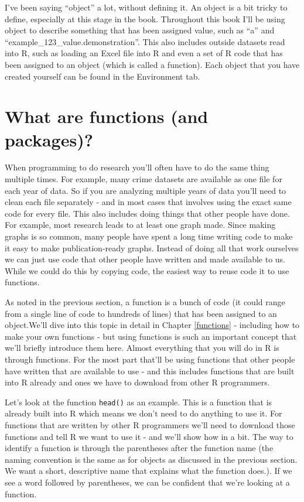 \documentclass[
]{krantz}
\begin{document}
I've been saying ``object'' a lot, without defining it. An object is a bit tricky to define, especially at this stage in the book. Throughout this book I'll be using object to describe something that has been assigned value, such as ``a'' and ``example\_123\_value.demonstration''. This also includes outside datasets read into R, such as loading an Excel file into R and even a set of R code that has been assigned to an object (which is called a function). Each object that you have created yourself can be found in the Environment tab.

\hypertarget{functions-intro}{%
\section{What are functions (and packages)?}\label{functions-intro}}

When programming to do research you'll often have to do the same thing multiple times. For example, many crime datasets are available as one file for each year of data. So if you are analyzing multiple years of data you'll need to clean each file separately - and in most cases that involves using the exact same code for every file. This also includes doing things that other people have done. For example, most research leads to at least one graph made. Since making graphs is so common, many people have spent a long time writing code to make it easy to make publication-ready graphs. Instead of doing all that work ourselves we can just use code that other people have written and made available to us. While we could do this by copying code, the easiest way to reuse code it to use functions.

As noted in the previous section, a function is a bunch of code (it could range from a single line of code to hundreds of lines) that has been assigned to an object.We'll dive into this topic in detail in Chapter \ref{functions} - including how to make your own functions - but using functions is such an important concept that we'll briefly introduce them here. Almost everything that you will do in R is through functions. For the most part that'll be using functions that other people have written that are available to use - and this includes functions that are built into R already and ones we have to download from other R programmers.

Let's look at the function \texttt{head()} as an example. This is a function that is already built into R which means we don't need to do anything to use it. For functions that are written by other R programmers we'll need to download those functions and tell R we want to use it - and we'll show how in a bit. The way to identify a function is through the parentheses after the function name (the naming convention is the same as for objects as discussed in the previous section. We want a short, descriptive name that explains what the function does.). If we see a word followed by parentheses, we can be confident that we're looking at a function.
\end{document}

